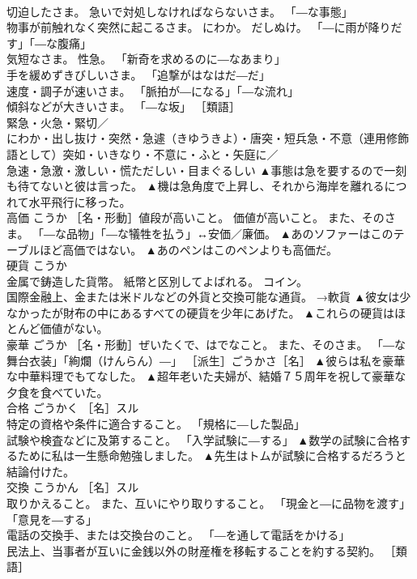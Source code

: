 \documentclass[8pt]{extreport}
\begin{document}
\begin{CJK}{UTF8}{min}
\\	切迫したさま。 急いで対処しなければならないさま。 「―な事態」 
\\	物事が前触れなく突然に起こるさま。 にわか。 だしぬけ。 「―に雨が降りだす」「―な腹痛」 
\\	気短なさま。 性急。 「新奇を求めるのに―なあまり」 
\\	手を緩めずきびしいさま。 「追撃がはなはだ―だ」 
\\	速度・調子が速いさま。 「脈拍が―になる」「―な流れ」 
\\	傾斜などが大きいさま。 「―な坂」 ［類語］ 
\\	緊急・火急・緊切／
\\	にわか・出し抜け・突然・急遽（きゆうきよ）・唐突・短兵急・不意（連用修飾語として）突如・いきなり・不意に・ふと・矢庭に／
\\	急速・急激・激しい・慌ただしい・目まぐるしい	▲事態は急を要するので一刻も待てないと彼は言った。 ▲機は急角度で上昇し、それから海岸を離れるにつれて水平飛行に移った。
\\	高価	こうか	［名・形動］値段が高いこと。 価値が高いこと。 また、そのさま。 「―な品物」「―な犠牲を払う」↔安価／廉価。	▲あのソファーはこのテーブルほど高価ではない。 ▲あのペンはこのペンよりも高価だ。
\\	硬貨	こうか	
\\	金属で鋳造した貨幣。 紙幣と区別してよばれる。 コイン。 
\\	国際金融上、金または米ドルなどの外貨と交換可能な通貨。 →軟貨	▲彼女は少なかったが財布の中にあるすべての硬貨を少年にあげた。 ▲これらの硬貨はほとんど価値がない。
\\	豪華	ごうか	［名・形動］ぜいたくで、はでなこと。 また、そのさま。 「―な舞台衣装」「絢爛（けんらん）―」 ［派生］ごうかさ［名］	▲彼らは私を豪華な中華料理でもてなした。 ▲超年老いた夫婦が、結婚７５周年を祝して豪華な夕食を食べていた。
\\	合格	ごうかく	［名］スル 
\\	特定の資格や条件に適合すること。 「規格に―した製品」 
\\	試験や検査などに及第すること。 「入学試験に―する」	▲数学の試験に合格するために私は一生懸命勉強しました。 ▲先生はトムが試験に合格するだろうと結論付けた。
\\	交換	こうかん	［名］スル 
\\	取りかえること。 また、互いにやり取りすること。 「現金と―に品物を渡す」「意見を―する」 
\\	電話の交換手、または交換台のこと。 「―を通して電話をかける」 
\\	民法上、当事者が互いに金銭以外の財産権を移転することを約する契約。 ［類語］

\end{CJK}
\end{document}
